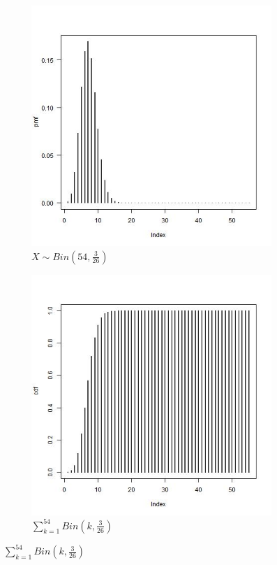 \documentclass[12pt]{article}
\begin{document}
	\begin{figure}[H]
		\caption{}
        \label{fig:}
		\centering
		\begin{subfigure}[b]{0.49\textwidth}
			\centering
			\includegraphics[width=\textwidth]{pmf.jpeg}
			\caption{$X \sim Bin(54, \frac{3}{26})$}
			\label{fig: Figure 1}
		\end{subfigure}
		\hfill
		\begin{subfigure}[b]{0.49\textwidth}
			\centering
			\label{fig: Figure 2}
			\includegraphics[width=\textwidth]{cdf.jpeg}
			\caption{$\sum_{k=1}^{54} Bin(k, \frac{3}{26})$}
		\end{subfigure}
		
   \end{figure}
\end{document}
